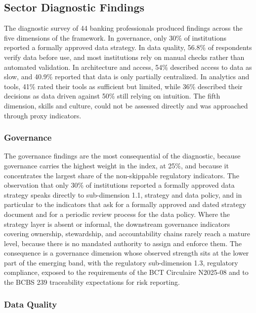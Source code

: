 \subsection{Sector Diagnostic Findings}

The diagnostic survey of 44 banking professionals produced findings across the five dimensions of the framework. In governance, only 30\% of institutions reported a formally approved data strategy. In data quality, 56.8\% of respondents verify data before use, and most institutions rely on manual checks rather than automated validation. In architecture and access, 54\% described access to data as slow, and 40.9\% reported that data is only partially centralized. In analytics and tools, 41\% rated their tools as sufficient but limited, while 36\% described their decisions as data driven against 50\% still relying on intuition. The fifth dimension, skills and culture, could not be assessed directly and was approached through proxy indicators.

\subsubsection{Governance}

The governance findings are the most consequential of the diagnostic, because governance carries the highest weight in the index, at 25\%, and because it concentrates the largest share of the non-skippable regulatory indicators. The observation that only 30\% of institutions reported a formally approved data strategy speaks directly to sub-dimension 1.1, strategy and data policy, and in particular to the indicators that ask for a formally approved and dated strategy document and for a periodic review process for the data policy. Where the strategy layer is absent or informal, the downstream governance indicators covering ownership, stewardship, and accountability chains rarely reach a mature level, because there is no mandated authority to assign and enforce them. The consequence is a governance dimension whose observed strength sits at the lower part of the emerging band, with the regulatory sub-dimension 1.3, regulatory compliance, exposed to the requirements of the BCT Circulaire N\textdegree{}2025-08 and to the BCBS 239 traceability expectations for risk reporting.

\subsubsection{Data Quality}

